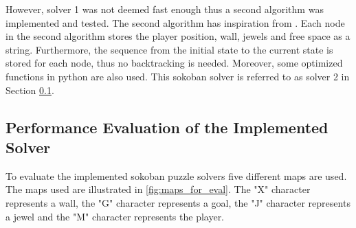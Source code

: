 \documentclass[../report.tex]{subfiles}
\begin{document}
However, solver 1 was not deemed fast enough thus a second algorithm was implemented and tested. The second algorithm has inspiration from \cite{sokoban_solver}. Each node in the second algorithm stores the player position, wall, jewels and free space as a string. Furthermore, the sequence from the initial state to the current state is stored for each node, thus no backtracking is needed. Moreover, some optimized functions in python are also used. This sokoban solver is referred to as solver 2 in Section \ref{subsec:sokoban_eval}.

\subsection{Performance Evaluation of the Implemented Solver} \label{subsec:sokoban_eval}
To evaluate the implemented sokoban puzzle solvers five different maps are used. The maps used are illustrated in \autoref{fig:maps_for_eval}. The "X" character represents a wall, the "G" character represents a goal, the "J" character represents a jewel and the "M" character represents the player.
\end{document}

